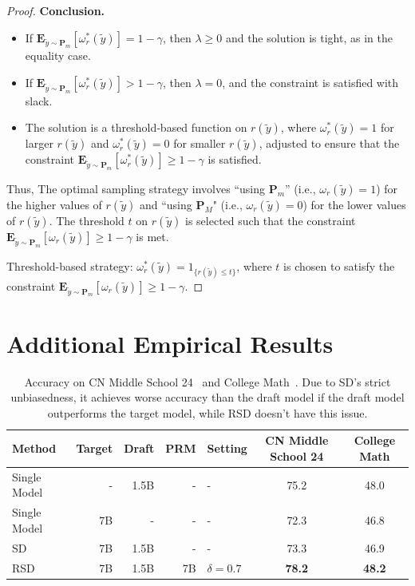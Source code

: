 \documentclass{article}
\theoremstyle{plain}
\theoremstyle{definition}
\theoremstyle{remark}
\begin{document}
\begin{proof}
\textbf{Conclusion.}
\begin{itemize}
   \item If \(\mathbf{E}_{\tilde{y} \sim \mathbf{P}_m} [\omega_r^*(\tilde{y})] = 1-\gamma\), then \(\lambda \geq 0\) and the solution is tight, as in the equality case.
   \item If \(\mathbf{E}_{\tilde{y} \sim \mathbf{P}_m} [\omega_r^*(\tilde{y})] > 1-\gamma\), then \(\lambda = 0\), and the constraint is satisfied with slack.
   \item The solution is a threshold‐based function on \(r(\tilde{y})\), where \(\omega_r^*(\tilde{y}) = 1\) for larger \(r(\tilde{y})\) and \(\omega_r^*(\tilde{y}) = 0\) for smaller \(r(\tilde{y})\), adjusted to ensure that the constraint \(\mathbf{E}_{\tilde{y} \sim \mathbf{P}_m} [\omega_r^*(\tilde{y})] \geq 1-\gamma\) is satisfied.
\end{itemize}

Thus,  
   The optimal sampling strategy involves ``using \( \mathbf{P}_m \)'' (i.e., \(\omega_r(\tilde{y}) = 1\)) for the higher values of \(r(\tilde{y})\) and ``using \( \mathbf{P}_M \)" (i.e., \(\omega_r(\tilde{y}) = 0\)) for the lower values of \(r(\tilde{y})\). The threshold \(t\) on \(r(\tilde{y})\) is selected such that the constraint \(\mathbf{E}_{\tilde{y} \sim \mathbf{P}_m}[\omega_r(\tilde{y})] \geq 1-\gamma\) is met.

 Threshold-based strategy: \( \omega_r^*(\tilde{y}) = 1_{\{r(\tilde{y}) \leq t\}} \), where \(t\) is chosen to satisfy the constraint \(\mathbf{E}_{\tilde{y} \sim \mathbf{P}_m}[\omega_r(\tilde{y})] \geq 1-\gamma\).

\end{proof}


\section{Additional Empirical Results}


\begin{table}[h!]
\caption{Accuracy on CN Middle School 24~\citep{yang2024qwen2math} and College Math~\citep{collegemath}. Due to SD's strict unbiasedness, it achieves worse accuracy than the draft model if the draft model outperforms the target model, while RSD doesn't have this issue.}
\label{tab:cn_middle_school}
\vskip 0.1in
\small
\begin{center}
\begin{tabular}{lrrrlcc}
\toprule
\textbf{Method} & \textbf{Target} & \textbf{Draft} & \textbf{PRM} & \textbf{Setting} & \textbf{CN Middle School 24} & \textbf{College Math}\\
\midrule
Single Model & - & 1.5B & - & - & 75.2 & 48.0 \\
Single Model & 7B & - & - & - & 72.3 & 46.8 \\
SD & 7B & 1.5B & - & - & 73.3 & 46.9 \\
\rowcolor{blue!8}
RSD & 7B & 1.5B & 7B & $\delta=0.7$ & \textbf{78.2} & \textbf{48.2} \\
\bottomrule
\end{tabular}
\end{center}
\vskip -0.1in
\end{table}
\end{document}
